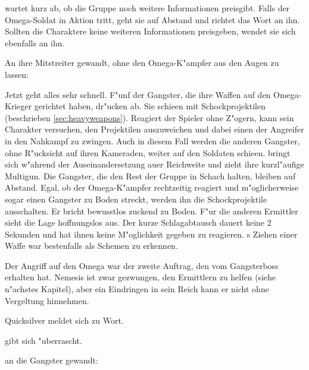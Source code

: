 \xl{} wartet kurz ab, ob die Gruppe noch weitere Informationen preisgibt. Falls der Omega-Soldat in Aktion tritt, geht sie auf Abstand und richtet das Wort an ihn. Sollten die Charaktere keine weiteren Informationen preisgeben, wendet sie sich ebenfalls an ihn.


An ihre Mitstreiter gewandt, ohne den Omega-K"ampfer aus den Augen zu lassen:


Jetzt geht alles sehr schnell. F"unf der Gangster, die ihre Waffen auf den Omega-Krieger gerichtet haben, dr"ucken ab. Sie schie\3en mit Schockprojektilen (beschrieben \cref{sec:heavyweapons}). Reagiert der Spieler ohne Z"ogern, kann sein Charakter versuchen, den Projektilen auszuweichen und dabei einen der Angreifer in den Nahkampf zu zwingen. Auch in diesem Fall werden die anderen Gangster, ohne R"ucksicht auf ihren Kameraden, weiter auf den Soldaten schie\3en. \xl{} bringt sich w"ahrend der Auseinandersetzung au\3er Reichweite und zieht ihre kurzl"aufige Multigun. Die Gangster, die den Rest der Gruppe in Schach halten, bleiben auf Abstand. Egal, ob der Omega-K"ampfer rechtzeitig reagiert und m"oglicherweise sogar einen Gangster zu Boden streckt, werden ihn die Schockprojektile ausschalten. Er bricht bewusstlos zuckend zu Boden. F"ur die anderen Ermittler sieht die Lage hoffnungslos aus. Der kurze Schlagabtausch dauert keine 2 Sekunden und hat ihnen keine M"oglichkeit gegeben zu reagieren. \xl{}s Ziehen einer Waffe war bestenfalls als Schemen zu erkennen.

Der Angriff auf den Omega war der zweite Auftrag, den \xl{} vom Gangsterboss erhalten hat. Nemesis ist zwar gezwungen, den Ermittlern zu helfen (siehe n"achstes Kapitel), aber ein Eindringen in sein Reich kann er nicht ohne Vergeltung hinnehmen.

Quicksilver meldet sich zu Wort. 


\xl{} gibt sich "uberrascht. 


\xl{} an die Gangster gewandt: 


